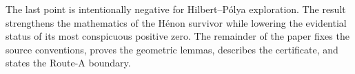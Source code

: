 The last point is intentionally negative for Hilbert--P\'olya exploration.
The result strengthens the mathematics of the H\'enon survivor while lowering
the evidential status of its most conspicuous positive zero.  The remainder
of the paper fixes the source conventions, proves the geometric lemmas,
describes the certificate, and states the Route-A boundary.
